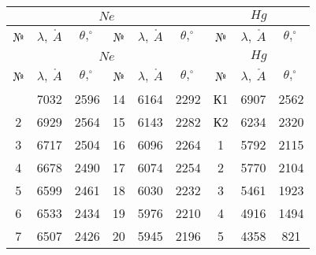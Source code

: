 \documentclass[a4paper, 12pt]{article}
\begin{document}
\renewcommand{\arraystretch}{1.5}
\begin{longtable}{|c|c|c|cccccc}
	\hline
        \multicolumn{6}{|c|}{$N\! e$} &
        \multicolumn{3}{c|}{$H\! g$}\\ \hline 
        №  & $\lambda, \: \mathring{A}$    & $\theta, ^{\circ}$   &
        \multicolumn{1}{c|}{№}  & \multicolumn{1}{c|}{$\lambda, \:
        \mathring{A}$}    & \multicolumn{1}{c|}{$\theta, ^{\circ}$}
        & \multicolumn{1}{c|}{№}  & \multicolumn{1}{c|}{$\lambda, \: \mathring{A}$}    & \multicolumn{1}{c|}{$\theta, ^{\circ}$}   \\ \hline
	\endfirsthead
	\hline
        \multicolumn{6}{|c|}{$N\! e$} &
        \multicolumn{3}{c|}{$H\! g$} \\ \hline 
        №  & $\lambda, \: \mathring{A}$    & $\theta, ^{\circ}$   &
        \multicolumn{1}{c|}{№}  & \multicolumn{1}{c|}{$\lambda, \:
        \mathring{A}$}    & \multicolumn{1}{c|}{$\theta, ^{\circ}$}
        & \multicolumn{1}{c|}{№}  & \multicolumn{1}{c|}{$\lambda, \: \mathring{A}$}    & \multicolumn{1}{c|}{$\theta, ^{\circ}$}   \\ \hline
        \endhead
	\endfoot
	\endlastfoot
1  & 7032 & 2596 & \multicolumn{1}{c|}{14} & \multicolumn{1}{c|}{6164} & \multicolumn{1}{c|}{2292} & \multicolumn{1}{c|}{К1} & \multicolumn{1}{c|}{6907} & \multicolumn{1}{c|}{2562} \\ \hline
2  & 6929 & 2564 & \multicolumn{1}{c|}{15} & \multicolumn{1}{c|}{6143} & \multicolumn{1}{c|}{2282} & \multicolumn{1}{c|}{К2} & \multicolumn{1}{c|}{6234} & \multicolumn{1}{c|}{2320} \\ \hline
3  & 6717 & 2504 & \multicolumn{1}{c|}{16} & \multicolumn{1}{c|}{6096} & \multicolumn{1}{c|}{2264} & \multicolumn{1}{c|}{1}  & \multicolumn{1}{c|}{5792} & \multicolumn{1}{c|}{2115} \\ \hline
4  & 6678 & 2490 & \multicolumn{1}{c|}{17} & \multicolumn{1}{c|}{6074} & \multicolumn{1}{c|}{2254} & \multicolumn{1}{c|}{2}  & \multicolumn{1}{c|}{5770} & \multicolumn{1}{c|}{2104} \\ \hline
5  & 6599 & 2461 & \multicolumn{1}{c|}{18} & \multicolumn{1}{c|}{6030} & \multicolumn{1}{c|}{2232} & \multicolumn{1}{c|}{3}  & \multicolumn{1}{c|}{5461} & \multicolumn{1}{c|}{1923} \\ \hline
6  & 6533 & 2434 & \multicolumn{1}{c|}{19} & \multicolumn{1}{c|}{5976} & \multicolumn{1}{c|}{2210} & \multicolumn{1}{c|}{4}  & \multicolumn{1}{c|}{4916} & \multicolumn{1}{c|}{1494} \\ \hline
7  & 6507 & 2426 & \multicolumn{1}{c|}{20} & \multicolumn{1}{c|}{5945} & \multicolumn{1}{c|}{2196} & \multicolumn{1}{c|}{5}  & \multicolumn{1}{c|}{4358} & \multicolumn{1}{c|}{821}  \\ \hline

\end{longtable}
\end{document}
